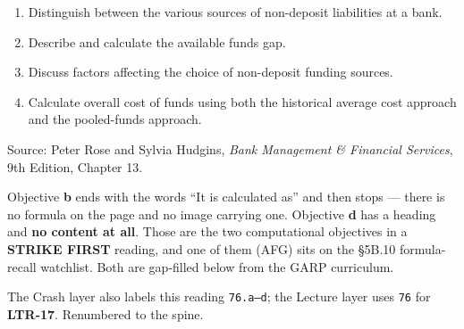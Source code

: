 
\begin{lrkeybox}
\begin{enumerate}[label=\textbf{\alph*.}]
\item Distinguish between the various sources of non-deposit liabilities at a bank.
\item Describe and calculate the available funds gap.
\item Discuss factors affecting the choice of non-deposit funding sources.
\item Calculate overall cost of funds using both the historical average cost approach and the pooled-funds approach.
\end{enumerate}
{\footnotesize\color{FRMGrey}Source: Peter Rose and Sylvia Hudgins, \textit{Bank Management \& Financial Services}, 9th Edition, Chapter 13.}
\end{lrkeybox}

\begin{lrtrapbox}
Objective \textbf{b} ends with the words ``It is calculated as'' and then stops --- there is no formula on the page and no image carrying one. Objective \textbf{d} has a heading and \textbf{no content at all}. Those are the two computational objectives in a \textbf{STRIKE FIRST} reading, and one of them (AFG) sits on the \S5B.10 formula-recall watchlist. Both are gap-filled below from the GARP curriculum.

The Crash layer also labels this reading \texttt{76.a--d}; the Lecture layer uses \texttt{76} for \textbf{LTR-17}. Renumbered to the spine.
\end{lrtrapbox}



